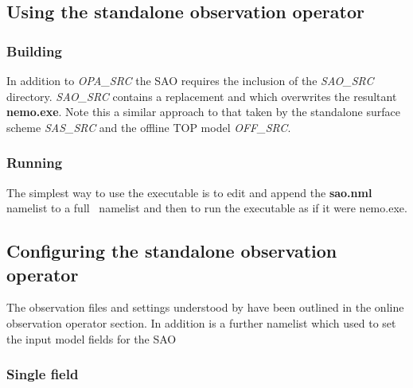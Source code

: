 \documentclass[../main/NEMO_manual]{subfiles}
\begin{document}

\subsection{Using the standalone observation operator}

\subsubsection{Building}

In addition to \emph{OPA\_SRC} the SAO requires the inclusion of the \emph{SAO\_SRC} directory.
\emph{SAO\_SRC} contains a replacement  and  which
overwrites the resultant \textbf{nemo.exe}.
Note this a similar approach to that taken by the standalone surface scheme \emph{SAS\_SRC} and the offline TOP model \emph{OFF\_SRC}.

\subsubsection{Running}

The simplest way to use the executable is to edit and append the \textbf{sao.nml} namelist to
a full \NEMO\ namelist and then to run the executable as if it were nemo.exe.

\subsection{Configuring the standalone observation operator}
The observation files and settings understood by  have been outlined in the online observation operator section.
In addition is a further namelist  which used to set the input model fields for the SAO

\subsubsection{Single field}
\end{document}
